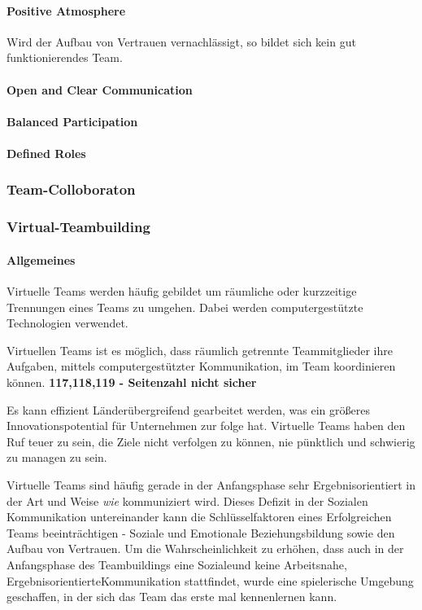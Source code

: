 \documentclass[a4paper,11pt]{article}%
\renewcommand{\\}{\vspace*{0.5\baselineskip} \newline}
\begin{document}
{	\paragraph{Positive Atmosphere}
	Wird der Aufbau von Vertrauen vernachlässigt, so bildet sich kein gut funktionierendes Team.
	\paragraph{Open and Clear Communication}
	\paragraph{Balanced Participation}
	\paragraph{Defined Roles}
	
		\subsubsection{Team-Colloboraton}
		\subsubsection{Virtual-Teambuilding}
		
		\paragraph{Allgemeines}
		Virtuelle Teams werden häufig gebildet um räumliche oder kurzzeitige Trennungen eines Teams zu umgehen. Dabei werden computergestützte Technologien verwendet. \citep[p. 1-2]{cascio2003leadership}
		
		Virtuellen Teams ist es möglich, dass räumlich getrennte Teammitglieder ihre Aufgaben, mittels computergestützter Kommunikation, im Team koordinieren können. \citep[p. 117-119]{peters2007identifying} \textbf{117,118,119 - Seitenzahl nicht sicher}
		
		Es kann effizient Länderübergreifend gearbeitet werden, was ein größeres Innovationspotential für Unternehmen zur folge hat.	
		Virtuelle Teams haben den Ruf teuer zu sein, die Ziele nicht verfolgen zu können, nie pünktlich und schwierig zu managen zu sein. \citep[p.243-244]{gassmann2003trends}
		
		Virtuelle Teams sind häufig gerade in der Anfangsphase sehr Ergebnisorientiert in der Art und Weise \textit{wie} kommuniziert wird. Dieses Defizit in der Sozialen Kommunikation untereinander kann die Schlüsselfaktoren eines Erfolgreichen Teams beeinträchtigen - Soziale und Emotionale Beziehungsbildung sowie den Aufbau von Vertrauen. \citep[p.378]{ren2007applying} \\
		Um die Wahrscheinlichkeit zu erhöhen, dass auch in der Anfangsphase des Teambuildings eine \glqq Soziale\grqq und keine \glqq Arbeitsnahe, Ergebnisorientierte\grqq Kommunikation stattfindet, wurde eine spielerische Umgebung geschaffen, in der sich das Team das erste mal kennenlernen kann. 
		
}
\end{document}

